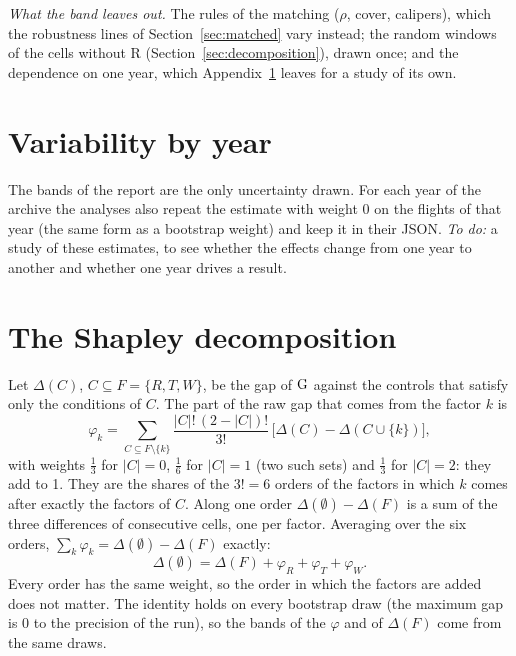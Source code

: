 \begin{table}
\centering\small

\caption{Share of the replicates (\%) whose 90\% band holds 0, and in parentheses the mean standard deviation of the band over the true one, for the two-way band of this report and the band used before in each point: blocks of episodes only (point 1), the product of the counts of pilots and blocks (point 2), blocks of episodes and site-days (point 4); all three before used the 5--95\% of the draws.
Variances of the pilot, block, flight and unit effects in the first column.}
\label{tab:coverage}
\end{table}

\emph{What the band leaves out.} The rules of the matching ($\rho$, cover, calipers), which the robustness lines of Section~\ref{sec:matched} vary instead; the random windows of the cells without R (Section~\ref{sec:decomposition}), drawn once; and the dependence on one year, which Appendix~\ref{app:years} leaves for a study of its own.

\section{Variability by year}\label{app:years}

The bands of the report are the only uncertainty drawn. For each year of the archive the analyses also repeat the estimate with weight 0 on the flights of that year (the same form as a bootstrap weight) and keep it in their JSON.
\emph{To do:} a study of these estimates, to see whether the effects change from one year to another and whether one year drives a result.

\section{The Shapley decomposition}\label{app:shapley}

Let $\Delta(C)$, $C\subseteq F=\{R,T,W\}$, be the gap of $\mathrm{G}$ against the controls that satisfy only the conditions of $C$. The part of the raw gap that comes from the factor $k$ is
\[
  \varphi_k=\sum_{C\subseteq F\setminus\{k\}}\frac{|C|!\,(2-|C|)!}{3!}\,\bigl[\Delta(C)-\Delta(C\cup\{k\})\bigr],
\]
with weights $\tfrac13$ for $|C|=0$, $\tfrac16$ for $|C|=1$ (two such sets) and $\tfrac13$ for $|C|=2$: they add to 1. They are the shares of the $3!=6$ orders of the factors in which $k$ comes after exactly the factors of $C$. Along one order $\Delta(\emptyset)-\Delta(F)$
is a sum of the three differences of consecutive cells, one per factor. Averaging over the six orders, $\sum_k\varphi_k=\Delta(\emptyset)-\Delta(F)$ exactly:
\[
  \Delta(\emptyset)=\Delta(F)+\varphi_R+\varphi_T+\varphi_W .
\]
Every order has the same weight, so the order in which the factors are added does not matter. The identity holds on every bootstrap draw (the maximum gap is 0 to the precision of the run), so the bands of the $\varphi$ and of $\Delta(F)$ come from the same draws.

